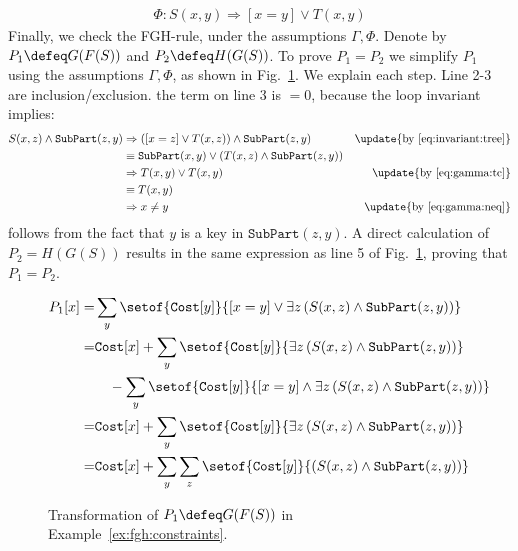 \begin{ex}
\begin{align}
\Phi: S(x,y) \Rightarrow [x=y] \vee T(x,y) \label{eq:invariant:tree}
  \end{align}
%
%
%
  Finally, we check the FGH-rule, under the assumptions
  $\Gamma, \Phi$.  Denote by $P_1 \defeq G(F(S))$ and
  $P_2 \defeq H(G(S))$.  To prove $P_1=P_2$ we simplify $P_1$ using
  the assumptions $\Gamma, \Phi$, as shown in
  Fig.~\ref{fig:fgh:constraints}. We explain each step.  Line 2-3 are
  inclusion/exclusion.   the term on
  line 3 is $=0$, because the loop invariant implies:
%
{\footnotesize
  \begin{align*}
     S(x,z) \wedge \texttt{SubPart}(z,y)& \Rightarrow  ([x=z] \vee T(x,z)) \wedge  \texttt{SubPart}(z,y) & \mbox{\update{by~\eqref{eq:invariant:tree}}}\\
&  \equiv \texttt{SubPart}(x,y) \vee (T(x,z) \wedge \texttt{SubPart}(z,y))\\
& \Rightarrow T(x,y) \vee T(x,y) & \mbox{\update{by~\eqref{eq:gamma:tc}}}\\
& \equiv  T(x,y) \\
& \Rightarrow  x\neq y & \mbox{\update{by~\eqref{eq:gamma:neq}}}
  \end{align*}
}
%
 follows from the fact that $y$ is a key in
$\texttt{SubPart}(z,y)$.  A direct calculation of $P_2 = H(G(S))$
results in the same expression as line 5 of
Fig.~\ref{fig:fgh:constraints}, proving that $P_1=P_2$.
\end{ex}

\begin{figure}
\footnotesize
  \begin{align*}
   P_1[x] = & \sum_y \setof{\texttt{Cost}[y]}{[x=y] \vee \exists z\left(S(x,z) \wedge \texttt{SubPart}(z,y)\right)}\\
    = & \texttt{Cost}[x]+\sum_y \setof{\texttt{Cost}[y]}{\exists z\left(S(x,z) \wedge \texttt{SubPart}(z,y)\right)}\\
      & \ \ \ - \sum_y\setof{\texttt{Cost}[y]}{[x=y] \wedge \exists z\left(S(x,z) \wedge \texttt{SubPart}(z,y)\right)}\\
    = & \texttt{Cost}[x]+\sum_y \setof{\texttt{Cost}[y]}{\exists z\left(S(x,z) \wedge \texttt{SubPart}(z,y)\right)}\\
    = & \texttt{Cost}[x]+\sum_y \sum_z \setof{\texttt{Cost}[y]}{\left(S(x,z) \wedge \texttt{SubPart}(z,y)\right)}
  \end{align*}
%
  \caption{Transformation of $P_1 \defeq G(F(S))$ in Example~\ref{ex:fgh:constraints}.}
  \label{fig:fgh:constraints}
\end{figure}

